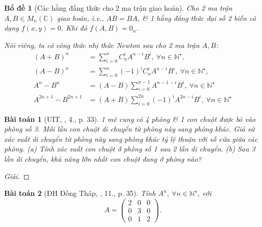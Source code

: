 \documentclass{article}
\newtheorem{baitoan}{Bài toán}
\newtheorem{bode}{Bổ đề}
\begin{document}
\begin{bode}[Các hằng đẳng thức cho 2 ma trận giao hoán]
	Cho 2 ma trận $A,B\in M_n(\mathbb{C})$ giao hoán, i.e., $AB = BA$, \& 1 hằng đẳng thức đại số 2 biến có dạng $f(x,y) = 0$. Khi đó $f(A,B) = 0_n$.
	
	Nói riêng, ta có công thức nhị thức Newton sau cho 2 ma trận $A,B$:
	\begin{align*}
		(A + B)^n &= \sum_{i=0}^n C_n^iA^{n - i}B^i,\ \forall n\in\mathbb{N}^\star,\\
		(A - B)^n &= \sum_{i=0}^n (-1)^iC_n^iA^{n - i}B^i,\ \forall n\in\mathbb{N}^\star,\\
		A^n - B^n &= (A - B)\sum_{i=0}^{n-1} A^{n - 1 - i}B^i,\ \forall n\in\mathbb{N}^\star\\
		A^{2n + 1} - B^{2n + 1} &= (A + B)\sum_{i=0}^{2n} (-1)^iA^{2n - i}B^i,\ \forall n\in\mathbb{N}^\star
	\end{align*}
\end{bode}

\begin{baitoan}[UIT, \cite{VMS_VMC2025}, 4., p. 33]
	1 mê cung có 4 phòng \& 1 con chuột được bỏ vào phòng số 3. Mỗi lần con chuột di chuyển từ phòng này sang phòng khác. Giả sử xác suất di chuyển từ phòng này sang phòng khác tỷ lệ thuận với số cửa giữa các phòng. (a) Tính xác suất con chuột ở phòng số 1 sau 2 lần di chuyển. (b) Sau 3 lần di chuyển, khả năng lớn nhất con chuột đang ở phòng nào?
\end{baitoan}

\begin{proof}[Giải]
	
\end{proof}

\begin{baitoan}[ĐH Đồng Tháp, \cite{VMS_VMC2025}, 11., p. 35]
	Tính $A^n$, $\forall n\in\mathbb{N}^\star$, với
	\begin{equation*}
		A = \begin{pmatrix}
			2 & 0 & 0\\0 & 3 & 0\\0 & 1 & 2
		\end{pmatrix}.
	\end{equation*}
\end{baitoan}
\end{document}
